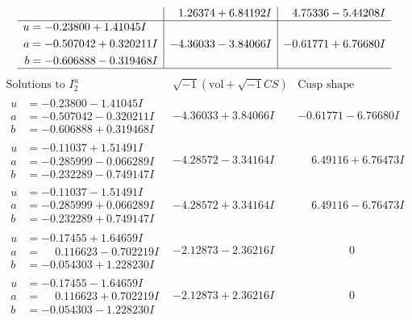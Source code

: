 \documentclass[1p]{elsarticle_modified}
\theoremstyle{definition}
\newcommand{\I}{\sqrt{-1}}
\begin{document}
$$\begin{array}{c|c|c}
 & \phantom{-}1.26374 + 6.84192 I & \phantom{-}4.75336 - 5.44208 I \\ \hline\begin{aligned}
u &= -0.23800 + 1.41045 I \\
a &= -0.507042 + 0.320211 I \\
b &= -0.606888 - 0.319468 I\end{aligned}
 & -4.36033 - 3.84066 I & -0.61771 + 6.76680 I\\
 \hline 
 \end{array}$$\newpage$$\begin{array}{c|c|c}  
\text{Solutions to }I^u_{2}& \I (\text{vol} + \sqrt{-1}CS) & \text{Cusp shape}\\
 \hline 
\begin{aligned}
u &= -0.23800 - 1.41045 I \\
a &= -0.507042 - 0.320211 I \\
b &= -0.606888 + 0.319468 I\end{aligned}
 & -4.36033 + 3.84066 I & -0.61771 - 6.76680 I \\ \hline\begin{aligned}
u &= -0.11037 + 1.51491 I \\
a &= -0.285999 - 0.066289 I \\
b &= -0.232289 - 0.749147 I\end{aligned}
 & -4.28572 - 3.34164 I & \phantom{-}6.49116 + 6.76473 I \\ \hline\begin{aligned}
u &= -0.11037 - 1.51491 I \\
a &= -0.285999 + 0.066289 I \\
b &= -0.232289 + 0.749147 I\end{aligned}
 & -4.28572 + 3.34164 I & \phantom{-}6.49116 - 6.76473 I \\ \hline\begin{aligned}
u &= -0.17455 + 1.64659 I \\
a &= \phantom{-}0.116623 - 0.702219 I \\
b &= -0.054303 + 1.228230 I\end{aligned}
 & -2.12873 - 2.36216 I & \phantom{-0.000000 } 0 \\ \hline\begin{aligned}
u &= -0.17455 - 1.64659 I \\
a &= \phantom{-}0.116623 + 0.702219 I \\
b &= -0.054303 - 1.228230 I\end{aligned}
 & -2.12873 + 2.36216 I & \phantom{-0.000000 } 0 \\ \hline\begin{aligned}

\end{aligned}
\end{array}$$
\end{document}
